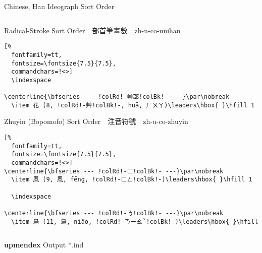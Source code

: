 \documentclass[aspectratio=169,10pt]{beamer}
\begin{document}
\begin{frame}[fragile]{Chinese, Han Ideograph Sort Order}
\begin{columns}
\begin{column}{73mm}
\begin{exampleblock}{Radical-Stroke {\footnotesize Sort Order~~部首筆畫數~~\scriptsize zh-u-co-unihan}}
\begin{Verbatim}[%
  fontfamily=tt,
  fontsize=\fontsize{7.5}{7.5},
  commandchars=!<>]
  \indexspace

\centerline{\bfseries --- !colRd!-艸部!colBk!- ---}\par\nobreak
  \item 花 (8, !colRd!-艸!colBk!-, huā, ㄏㄨㄚ)\leaders\hbox{ }\hfill 1
\end{Verbatim}
\end{exampleblock}
\begin{exampleblock}{Zhuyin {\footnotesize (Bopomofo) Sort Order~~注音符號~~\scriptsize zh-u-co-zhuyin}}
\makeatletter
\def\verbatim@font{\fontsize{7.5}{7.5}\selectfont\textjapanese}
\makeatother
\begin{Verbatim}[%
  fontfamily=tt,
  fontsize=\fontsize{7.5}{7.5},
  commandchars=!<>]
\centerline{\bfseries --- !colRd!-ㄈ!colBk!- ---}\par\nobreak
  \item 風 (9, 風, fēng, !colRd!-ㄈㄥ!colBk!-)\leaders\hbox{ }\hfill 1

  \indexspace

\centerline{\bfseries --- !colRd!-ㄋ!colBk!- ---}\par\nobreak
  \item 鳥 (11, 鳥, niǎo, !colRd!-ㄋㄧㄠˇ!colBk!-)\leaders\hbox{ }\hfill
\end{Verbatim}
\end{exampleblock}
\end{column}
\end{columns}
\begin{center}
\textbf{upmendex} Output *.ind
\end{center}
\end{frame}

\end{document}
